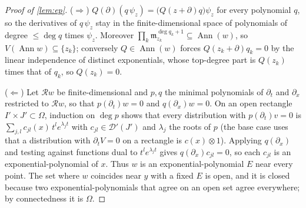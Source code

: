 \documentclass[11pt]{article}
\theoremstyle{plain}
\theoremstyle{definition}
\theoremstyle{remark}
\newcommand{\ring}{\mathcal{R}}            %
\DeclareMathOperator{\Ann}{Ann}             %
\newcommand{\Var}{V}                        %
\begin{document}
\begin{proof}[Proof of \cref{lem:ep}]
($\Rightarrow$) $Q(\partial)(q\,\psi_z)=\big(Q(z+\partial)q\big)\psi_z$ for every polynomial $q$, so the derivatives of
$q\,\psi_z$ stay in the finite-dimensional space of polynomials of degree $\le\deg q$ times $\psi_z$. Moreover
$\prod_k\mathfrak m_{z_k}^{\deg q_k+1}\subseteq\Ann(w)$, so $\Var(\Ann w)\subseteq\{z_k\}$; conversely
$Q\in\Ann(w)$ forces $Q(z_k+\partial)q_k=0$ by the linear independence of distinct exponentials, whose top-degree part
is $Q(z_k)$ times that of $q_k$, so $Q(z_k)=0$.

($\Leftarrow$) Let $\ring w$ be finite-dimensional and $p,q$ the minimal polynomials of $\partial_t$ and
$\partial_x$ restricted to $\ring w$, so that $p(\partial_t)w=0$ and $q(\partial_x)w=0$. On an open rectangle $I'\times J'\subset\Omega$, induction
on $\deg p$ shows that every distribution with $p(\partial_t)v=0$ is $\sum_{j,l}c_{jl}(x)\,t^le^{\lambda_jt}$ with
$c_{jl}\in\mathcal D'(J')$ and $\lambda_j$ the roots of $p$ (the base case uses that a distribution with
$\partial_tV=0$ on a rectangle is $c(x)\otimes1$). Applying $q(\partial_x)$ and testing against functions dual to
$t^le^{\lambda_jt}$ gives $q(\partial_x)c_{jl}=0$, so each $c_{jl}$ is an exponential-polynomial of $x$. Thus $w$ is an
exponential-polynomial $E$ near every point. The set where $w$ coincides near $y$ with a fixed $E$ is open, and it is
closed because two exponential-polynomials that agree on an open set agree everywhere; by connectedness it is
$\Omega$.
\end{proof}
\end{document}
